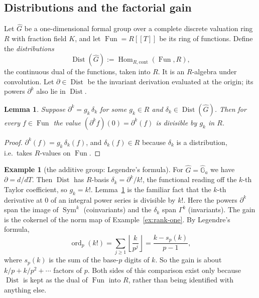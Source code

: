 \documentclass[11pt]{amsart}
\newtheorem{lemma}[theorem]{Lemma}
\theoremstyle{definition}
\newtheorem{example}[theorem]{Example}
\theoremstyle{remark}
\DeclareMathOperator{\Hom}{Hom}
\DeclareMathOperator{\Sym}{Sym}
\DeclareMathOperator{\ord}{ord}
\DeclareMathOperator{\Dist}{Dist}
\DeclareMathOperator{\Fun}{Fun}
\begin{document}
\subsection{Distributions and the factorial gain}
Let $\widehat G$ be a one-dimensional formal group over a complete discrete valuation ring $R$ with fraction field $K$, and let $\Fun=R[[T]]$ be its ring of functions. Define the \emph{distributions}
\[
\Dist(\widehat G):=\Hom_{R,\mathrm{cont}}(\Fun,R),
\]
the continuous dual of the functions, taken into $R$. It is an $R$-algebra under convolution. Let $\partial\in\Dist$ be the invariant derivation evaluated at the origin; its powers $\partial^k$ also lie in $\Dist$.

\begin{lemma}\label{lem:gain}
Suppose $\partial^k=g_k\,\delta_k$ for some $g_k\in R$ and $\delta_k\in\Dist(\widehat G)$. Then for every $f\in\Fun$ the value $(\partial^kf)(0)=\partial^k(f)$ is divisible by $g_k$ in $R$.
\end{lemma}

\begin{proof}
$\partial^k(f)=g_k\,\delta_k(f)$, and $\delta_k(f)\in R$ because $\delta_k$ is a distribution, i.e.\ takes $R$-values on $\Fun$.
\end{proof}

\begin{example}[the additive group: Legendre's formula]\label{ex:additive}
For $\widehat G=\widehat{\mathbb G}_a$ we have $\partial=d/dT$. Then $\Dist$ has $R$-basis $\delta_k=\partial^k/k!$, the functional reading off the $k$-th Taylor coefficient, so $g_k=k!$. Lemma~\ref{lem:gain} is the familiar fact that the $k$-th derivative at $0$ of an integral power series is divisible by $k!$. Here the powers $\partial^k$ span the image of $\Sym^k$ (coinvariants) and the $\delta_k$ span $\Gamma^k$ (invariants). The gain is the cokernel of the norm map of Example~\ref{ex:rank-one}. By Legendre's formula,
\[
\ord_p(k!)=\sum_{j\ge1}\left\lfloor\frac{k}{p^j}\right\rfloor=\frac{k-s_p(k)}{p-1},
\]
where $s_p(k)$ is the sum of the base-$p$ digits of $k$. So the gain is about $k/p+k/p^2+\cdots$ factors of $p$. Both sides of this comparison exist only because $\Dist$ is kept as the dual of $\Fun$ into $R$, rather than being identified with anything else.
\end{example}
\end{document}
